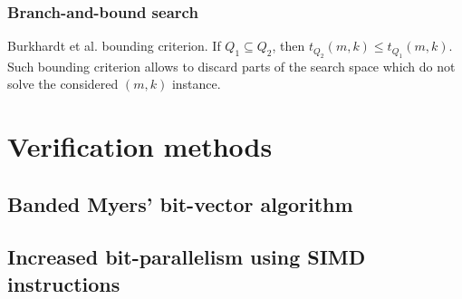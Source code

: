 \subsubsection{Branch-and-bound search}

Burkhardt et al. \citep{Burkhardt2001} bounding criterion. If $Q_1 \subseteq Q_2$, then $t_{Q_2}(m,k) \leq t_{Q_1}(m,k)$.
Such bounding criterion allows to discard parts of the search space which do not solve the considered $(m,k)$ instance.


\section{Verification methods}
\label{sec:verification}
\subsection{Banded Myers' bit-vector algorithm}
\subsection{Increased bit-parallelism using SIMD instructions}
